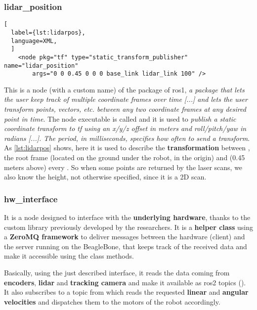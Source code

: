 \subsubsection{lidar\_position} %

\begin{lstlisting}[
  label={lst:lidarpos},
  language=XML,
  ]
    <node pkg="tf" type="static_transform_publisher" name="lidar_position"
        args="0 0 0.45 0 0 0 base_link lidar_link 100" />
\end{lstlisting}

This is a node (with a custom name) of the  package of \acrshort{ros}1, \textit{a package that lets the user keep track of multiple coordinate frames over time [...] and lets the user transform points, vectors, etc. between any two coordinate frames at any desired point in time}. \cite{tf} The node executable is called  and it is used to \textit{publish a static coordinate transform to tf using an x/y/z offset in meters and roll/pitch/yaw in radians [...]. The period, in milliseconds, specifies how often to send a transform}. \cite{tf} 
As \autoref{lst:lidarpos} shows, here it is used to describe the \textbf{transformation} between , the root frame (located on the ground under the robot, in the origin) and  (0.45 meters above) every . So when some points are returned by the laser scans, we also know the height, not otherwise specified, since it is a 2D scan.  

\subsubsection{hw\_interface}

It is a node designed to interface with the \textbf{underlying hardware}, thanks to the custom  library previously developed by the researchers. It is a \textbf{helper class} using a \textbf{ZeroMQ framework} to deliver messages between the hardware (client) and the server running on the BeagleBone, that keeps track of the received data and make it accessible using the class methods.

Basically, using the just described interface, it reads the data coming from \textbf{encoders}, \textbf{lidar} and \textbf{tracking camera} and make it available as \acrshort{ros}2 topics (). It also subscribes to a  topic from which reads the requested \textbf{linear} and \textbf{angular velocities} and dispatches them to the motors of the robot accordingly.

